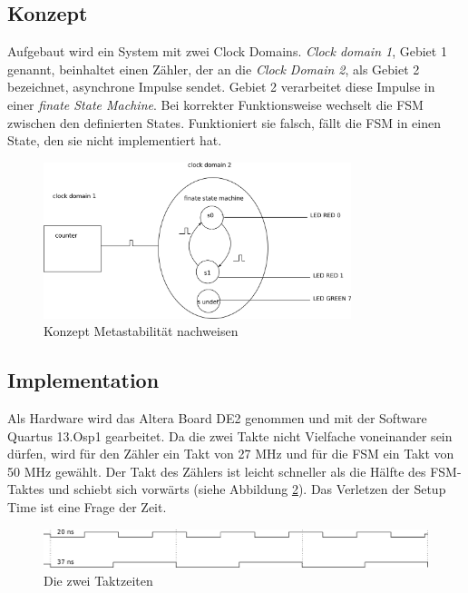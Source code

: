 \subsection{Konzept}\label{sect.metastabil_ansatz}

Aufgebaut wird ein System mit zwei Clock Domains. \textit{Clock domain 1}, Gebiet 1 genannt,  beinhaltet einen Zähler, der an die \textit{Clock Domain 2}, als Gebiet 2 bezeichnet, asynchrone Impulse sendet. Gebiet 2 verarbeitet diese Impulse in einer \textit{finate State Machine}. Bei korrekter Funktionsweise wechselt die FSM zwischen den definierten States. Funktioniert sie falsch, fällt die FSM in einen State, den sie nicht implementiert hat.

\begin{figure}[H]
	\includegraphics[width=0.8\textwidth]{images/metastability/konzept.png}
	\caption{Konzept Metastabilität nachweisen}
	\label{fig.metastabil.fsm}
\end{figure}

\subsection{Implementation}\label{sect.metastabil_implementation}

Als Hardware wird das Altera Board DE2 genommen und mit der Software Quartus 13.Osp1 gearbeitet. Da die zwei Takte nicht Vielfache voneinander sein dürfen, wird für den Zähler ein Takt von 27 MHz und für die FSM ein Takt von 50 MHz gewählt. Der Takt des Zählers ist leicht schneller als die Hälfte des FSM-Taktes und schiebt sich  vorwärts (siehe Abbildung \ref{fig.metastabil.takte}). Das Verletzen der Setup Time ist eine Frage der Zeit.

\begin{figure}[H]
	\includegraphics[width=1\textwidth]{images/metastability/2_takte.png}
	\caption{Die zwei Taktzeiten}
	\label{fig.metastabil.takte}
\end{figure}

